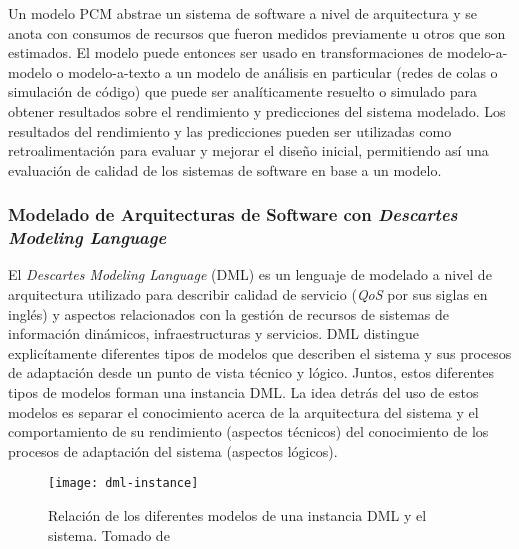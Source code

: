 Un modelo PCM abstrae un sistema de software a nivel de arquitectura y se anota con consumos de recursos que fueron medidos previamente u otros que son estimados. El modelo puede entonces ser usado en transformaciones de modelo-a-modelo o modelo-a-texto a un modelo de análisis en particular (redes de colas o simulación de código) que puede ser analíticamente resuelto o simulado para obtener resultados sobre el rendimiento y predicciones del sistema modelado. Los resultados del rendimiento y las predicciones pueden ser utilizadas como retroalimentación para evaluar y mejorar el diseño inicial, permitiendo así una evaluación de calidad de los sistemas de software en base a un modelo\cite{Noorshams2015_1000046750}.


\subsubsection{Modelado de Arquitecturas de Software con \emph{Descartes Modeling Language}} \label{sec:dml}
El \emph{Descartes Modeling Language} (DML) es un lenguaje de modelado a nivel de arquitectura utilizado para describir calidad de servicio (\emph{QoS} por sus siglas en inglés) y aspectos relacionados con la gestión de recursos de sistemas de información dinámicos, infraestructuras y servicios. DML distingue explicítamente diferentes tipos de modelos que describen el sistema y sus procesos de adaptación desde un punto de vista técnico y lógico. Juntos, estos diferentes tipos de modelos forman una instancia DML. La idea detrás del uso de estos modelos es separar el conocimiento acerca de la arquitectura del sistema y el comportamiento de su rendimiento (aspectos técnicos) del conocimiento de los procesos de adaptación del sistema (aspectos lógicos)\cite{KoBrHu2014-TechReport-DML}.

\begin{figure}[h]
  \centering
  \texttt{[image: dml-instance]}
  \caption[Relación de los diferentes modelos de una instancia DML y el sistema]{Relación de los diferentes modelos de una instancia DML y el sistema. Tomado de \protect\cite{KoBrHu2014-TechReport-DML}}
  \label{fig:dml-instance}
\end{figure}

